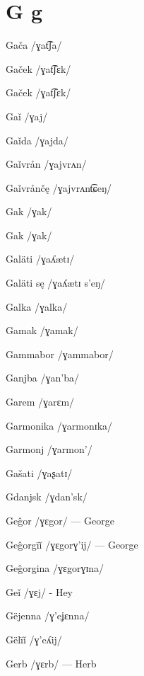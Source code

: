\chapter{G g}

Gača /ɣat͡ʃa/

Gaček /ɣat͡ʃɛk/

Gaček /ɣat͡ʃɛk/

Gaǐ /ɣaj/

Gaǐda /ɣajda/

Gaǐvrån /ɣajvrʌn/

Gaǐvrånčę /ɣajvrʌnt͡ɕeŋ/

Gak /ɣak/

Gak /ɣak/

Galäti /ɣaʎætɪ/

Galäti sę /ɣaʎætɪ s’eŋ/

Galka /ɣalka/

Gamak /ɣamak/

Gammabor /ɣammabor/

Ganjba /ɣan’ba/

Garem /ɣarɛm/

Garmonika /ɣarmonɪka/

Garmonj /ɣarmon’/

Gašati /ɣaʂatɪ/

Gdanjsk /ɣdan’sk/

Geĝor /ɣɛgor/ — George

Geĝorgïǐ /ɣɛgorɣ’ij/ — George

Geĝorgina /ɣɛgorɣɪna/

Geǐ /ɣɛj/ - Hey

Gëjenna /ɣ’eʝɛnna/

Gëlïǐ /ɣ’eʎij/

Gerb /ɣɛrb/ — Herb

